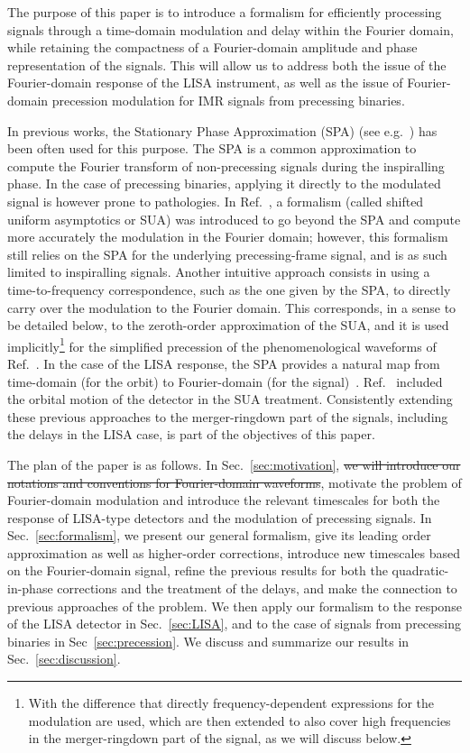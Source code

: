 \documentclass[aps,showpacs,twocolumn,
prd,superscriptaddress,nofootinbib]{revtex4-1}
\begin{document}
The purpose of this paper is to introduce a formalism for efficiently processing signals through a time-domain modulation and delay within the Fourier domain, while retaining the compactness of a Fourier-domain amplitude and phase representation of the signals. This will allow us to address both the issue of the Fourier-domain response of the LISA instrument, as well as the issue of Fourier-domain precession modulation for IMR signals from precessing binaries.

In previous works, the Stationary Phase Approximation (SPA) (see e.g.~\cite{Thorne300, CF94}) has been often used for this purpose. The SPA is a common approximation to compute the Fourier transform of non-precessing signals during the inspiralling phase. In the case of precessing binaries, applying it directly to the modulated signal is however prone to pathologies. In Ref.~\cite{KCY13,KCY14}, a formalism (called shifted uniform asymptotics or SUA) was introduced to go beyond the SPA and compute more accurately the modulation in the Fourier domain; however, this formalism still relies on the SPA for the underlying precessing-frame signal, and is as such limited to inspiralling signals. Another intuitive approach consists in using a time-to-frequency correspondence, such as the one given by the SPA, to directly carry over the modulation to the Fourier domain. This corresponds, in a sense to be detailed below, to the zeroth-order approximation of the SUA, and it is used implicitly\footnote{With the difference that directly frequency-dependent expressions for the modulation are used, which are then extended to also cover high frequencies in the merger-ringdown part of the signal, as we will discuss below.} for the simplified precession of the phenomenological waveforms of Ref.~\cite{Hannam+13}. In the case of the LISA response, the SPA provides a natural map from time-domain (for the orbit) to Fourier-domain (for the signal)~\cite{Cutler97}. Ref.~\cite{Klein+15} included the orbital motion of the detector in the SUA treatment. Consistently extending these previous approaches to the merger-ringdown part of the signals, including the delays in the LISA case, is part of the objectives of this paper.

The plan of the paper is as follows. In Sec.~\ref{sec:motivation}, \sout{we will introduce our notations and conventions for Fourier-domain waveforms}, motivate the problem of Fourier-domain modulation and introduce the relevant timescales for both the response of LISA-type detectors and the modulation of precessing signals. In Sec.~\ref{sec:formalism}, we present our general formalism, give its leading order approximation as well as higher-order corrections, introduce new timescales based on the Fourier-domain signal, refine the previous results for both the quadratic-in-phase corrections and the treatment of the delays, and make the connection to previous approaches of the problem. We then apply our formalism to the response of the LISA detector in Sec.~\ref{sec:LISA}, and to the case of signals from precessing binaries in Sec~\ref{sec:precession}. We discuss and summarize our results in Sec.~\ref{sec:discussion}.
\end{document}
